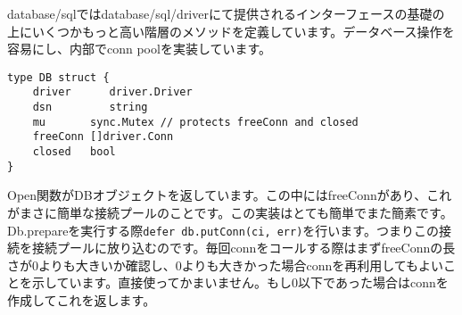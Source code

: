 database/sqlではdatabase/sql/driverにて提供されるインターフェースの基礎の上にいくつかもっと高い階層のメソッドを定義しています。データベース操作を容易にし、内部でconn poolを実装しています。

\begin{lstlisting}[numbers=none]
type DB struct {
    driver      driver.Driver
    dsn         string
    mu       sync.Mutex // protects freeConn and closed
    freeConn []driver.Conn
    closed   bool
}
\end{lstlisting}

Open関数がDBオブジェクトを返しています。この中にはfreeConnがあり、これがまさに簡単な接続プールのことです。この実装はとても簡単でまた簡素です。Db.prepareを実行する際\texttt{defer db.putConn(ci, err)}を行います。つまりこの接続を接続プールに放り込むのです。毎回connをコールする際はまずfreeConnの長さが0よりも大きいか確認し、0よりも大きかった場合connを再利用してもよいことを示しています。直接使ってかまいません。もし0以下であった場合はconnを作成してこれを返します。
